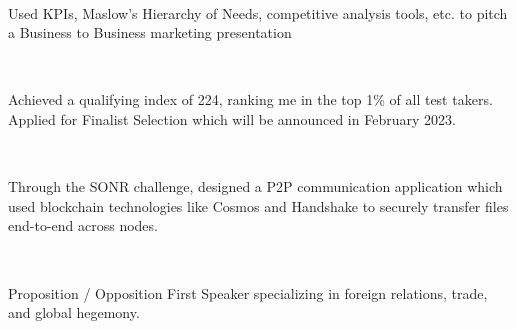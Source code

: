 \documentclass[a4paper]{MagicalCV}
\begin{document}
\begin{minipage}[t]{0.66\textwidth} 


 \\
\vspace{\topsep} %
\begin{tightemize}
\item Used KPIs, Maslow's Hierarchy of Needs, competitive analysis tools, etc. to pitch a Business to Business marketing presentation
\end{tightemize}
\sectionsep

 \\
\vspace{\topsep} %
\begin{tightemize}
\item Achieved a qualifying index of 224, ranking me in the top 1\% of all test takers. Applied for Finalist Selection which will be announced in February 2023.
\end{tightemize}
\sectionsep

 \\
\vspace{\topsep} %
\begin{tightemize}
\item Through the SONR challenge, designed a P2P communication application which used blockchain technologies like Cosmos and Handshake to securely transfer files end-to-end across nodes. 
\end{tightemize}
\sectionsep

 \\
\vspace{\topsep} %
\begin{tightemize}
\item Proposition / Opposition First Speaker specializing in foreign relations, trade, and global hegemony.
\end{tightemize}
\sectionsep


\end{minipage}
\end{document}
